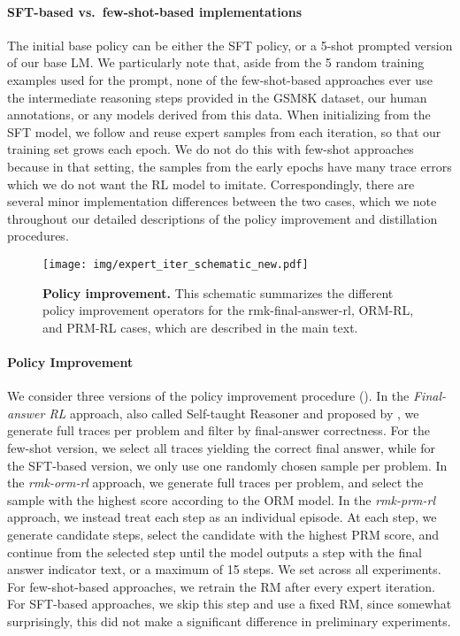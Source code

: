 \documentclass[11pt, a4paper, logo]{deepmind}
\newcommand{\ORM}{ORM}
\newcommand{\PRM}{PRM}
\newcommand{\Short}[1]{\csname rmk-#1\endcsname}
\newcommand{\finalanswerrl}{\Short{final-answer-rl}}
\newcommand{\ormrl}{ORM-RL}
\newcommand{\prmrl}{PRM-RL}
\begin{document}
\paragraph{SFT-based vs.\ few-shot-based implementations}
The initial base policy can be either the SFT policy, or a 5-shot prompted version of our base LM. We particularly note that, aside from the 5 random training examples used for the prompt, none of the few-shot-based approaches ever use the intermediate reasoning steps provided in the GSM8K dataset, our human annotations, or any models derived from this data.
When initializing from the SFT model, we follow \citet{polu2020generative} and reuse expert samples from each iteration, so that our training set grows each epoch. 
We do not do this with few-shot approaches because in that setting, the samples from the early epochs have many trace errors which we do not want the RL model to imitate.
Correspondingly, there are several minor implementation differences between the two cases, which we note throughout our detailed descriptions of the policy improvement and distillation procedures.

\begin{figure}[t!]
\centering
\texttt{[image: img/expert\_iter\_schematic\_new.pdf]}
\caption{\textbf{Policy improvement.} This schematic summarizes the different policy improvement operators for the \finalanswerrl, \ormrl, and \prmrl{} cases, which are described in the main text.
\label{fig:policy_improvement}}
\vspace{-12pt}
\end{figure}

\paragraph{Policy Improvement}
We consider three versions of the policy improvement procedure ().
In the \emph{Final-answer RL} approach, also called Self-taught Reasoner and proposed by \citet{zelikman2022star}, we generate  full traces per problem and filter by final-answer correctness. For the few-shot version, we select all traces yielding the correct final answer, while for the SFT-based version, we only use one randomly chosen sample per problem.
In the \emph{\Short{orm-rl}} approach, we generate  full traces per problem, and select the sample with the highest score according to the \ORM{} model.
In the \emph{\Short{prm-rl}} approach, we instead treat each step as an individual episode. At each step, we generate  candidate steps, select the candidate with the highest \PRM{} score, and continue from the selected step until the model outputs a step with the final answer indicator text, or a maximum of 15 steps.
We set  across all experiments.
For few-shot-based approaches, we retrain the RM after every expert iteration.
For SFT-based approaches, we skip this step and use a fixed RM, since somewhat surprisingly, this did not make a significant difference in preliminary experiments.
\end{document}
